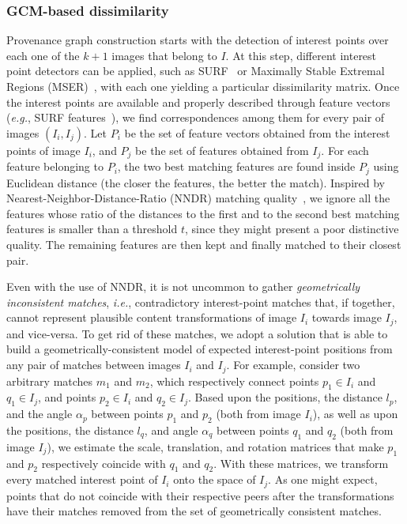 \vspace{0.2cm}
\subsubsection*{GCM-based dissimilarity}
Provenance graph construction starts with the detection of interest points over each one of the $k+1$ images that belong to $I$.
At this step, different interest point detectors can be applied, such as SURF~\cite{Bay:CVIU:2008} or Maximally Stable Extremal Regions (MSER)~\cite{Matas_2004}, with each one yielding a particular dissimilarity matrix. Once the interest points are available and properly described through feature vectors (\textit{e.g.}, SURF features~\cite{Bay:CVIU:2008}), we find correspondences among them for every pair of images $(I_i, I_j)$.
Let $P_i$ be the set of feature vectors obtained from the interest points of image $I_i$, and $P_j$ be the set of features obtained from $I_j$.
For each feature belonging to $P_i$, the two best matching features are found inside $P_j$ using Euclidean distance (the closer the features, the better the match).
Inspired by Nearest-Neighbor-Distance-Ratio (NNDR) matching quality~\cite{lowe2004distinctive}, we ignore all the features whose ratio of the distances to the first and to the second best matching features is smaller than a threshold $t$, since they might present a poor distinctive quality.
The remaining features are then kept and finally matched to their closest pair.

Even with the use of NNDR, it is not uncommon to gather \emph{geometrically inconsistent matches}, \textit{i.e.}, contradictory interest-point matches that, if together, cannot represent plausible content transformations of image $I_i$ towards image $I_j$, and vice-versa. %
To get rid of these matches, we adopt a solution that is able to build a geometrically-consistent model of expected interest-point positions from any pair of matches between images $I_i$ and $I_j$.
For example, consider two arbitrary matches $m_1$ and $m_2$, which respectively connect points $p_1 \in I_i$ and $q_1 \in I_j$, and points $p_2 \in I_i$ and $q_2 \in I_j$.
Based upon the positions, the distance $l_p$, and the angle $\alpha_p$ between points $p_1$ and $p_2$ (both from image $I_i$), as well as upon the positions, the distance $l_q$, and angle $\alpha_q$ between points $q_1$ and $q_2$ (both from image $I_j$), we estimate the scale, translation, and rotation matrices that make $p_1$ and $p_2$ respectively coincide with $q_1$ and $q_2$.
With these matrices, we transform every matched interest point of $I_i$ onto the space of $I_j$.
As one might expect, points that do not coincide with their respective peers after the transformations have their matches removed from the set of geometrically consistent matches.

